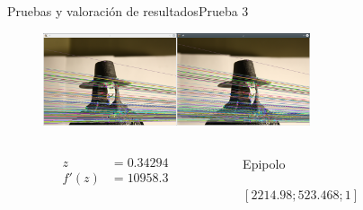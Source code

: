 \documentclass[aspectratio=169,14pt,spanish]{beamer}
\begin{document}
      \begin{frame}{Pruebas y valoración de resultados}{Prueba 3}

        \begin{overlayarea}{\textwidth}{8cm}
             {\begin{figure}[ht!]
              \centering
              \includegraphics[width=0.7\textwidth]{../Informe/V-Normal.png}
            \end{figure}

            \begin{columns}
              \begin{column}{0.2\textwidth}
                \begin{align*}
                  z &= 0.34294 \\
                  f'(z) &= 10958.3
                \end{align*}
              \end{column}
              \begin{column}{0.8\textwidth}
                Epipolo

                $[2214.98; 523.468; 1]$
              \end{column}
            \end{columns}


            }
\end{overlayarea}
\end{frame}
\end{document}

